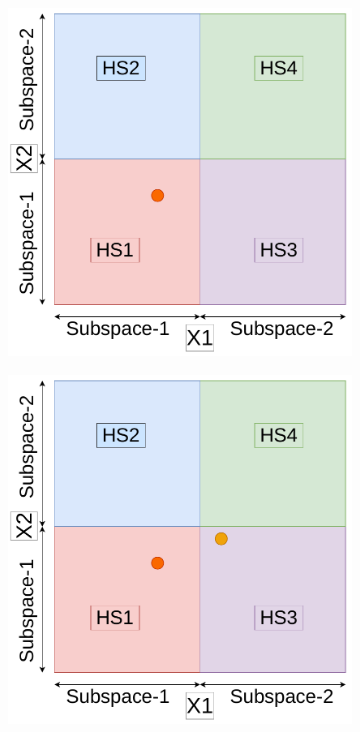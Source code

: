\begin{figure}[H]
\begin{subfigure}{0.45\textwidth}
		\caption{}
		\label{fig:dsbo-b}
	\end{subfigure}
	\begin{subfigure}{0.45\textwidth}
		\centering
		\includegraphics[scale=0.33]{figures/dbo/dbo-03.pdf}
		\caption{}
		\label{fig:dsbo-c}
	\end{subfigure}
	\begin{subfigure}{0.45\textwidth}
		\centering
		\includegraphics[scale=0.33]{figures/dbo/dbo-04.pdf}

\end{subfigure}
\end{figure}
